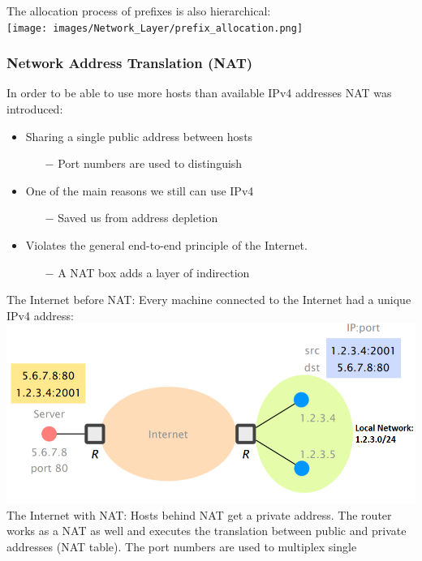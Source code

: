 \documentclass[a4paper, fontsize=8pt, landscape, DIV=1]{scrartcl}
\begin{document}
\begin{multicols*}{4}
		The allocation process of prefixes is also hierarchical:\\
		
		\texttt{[image: images/Network\_Layer/prefix\_allocation.png]}
		
		\subsubsection{Network Address Translation (NAT)}
		In order to be able to use more hosts than available IPv4 addresses NAT was
		introduced: 
		\begin{itemize}[noitemsep]
			\item Sharing a single public address between hosts
			\begin{itemize}
				\item[$-$] Port numbers are used to distinguish
			\end{itemize}
			\item One of the main reasons we still can use IPv4
			\begin{itemize}
				\item[$-$] Saved us from address depletion
			\end{itemize}
			\item Violates the general end-to-end principle of the Internet. 
			\begin{itemize}
				\item[$-$] A NAT box adds a layer of indirection
			\end{itemize}
		\end{itemize}
		The Internet before NAT: Every machine connected to the Internet had a
		unique IPv4 address:\\
		\includegraphics[width=\columnwidth]{images/Network_Layer/NAT_no.png}
		The Internet with NAT: Hosts behind NAT get a private address. The router
		works as a NAT as well and executes the translation between public and private
		addresses (NAT table). The port numbers are used to multiplex single

\end{multicols*}
\end{document}
